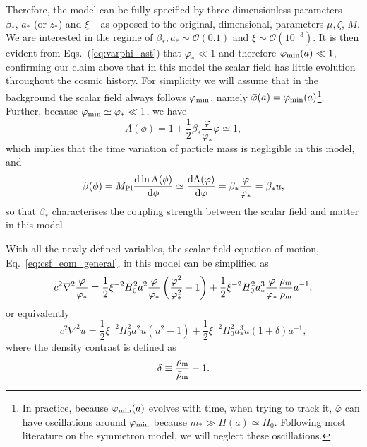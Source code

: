 Therefore, the model can be fully specified by three dimensionless parameters -- $\beta_\ast$, $a_\ast$ (or $z_\ast$) and $\xi$ -- as opposed to the original, dimensional, parameters $\mu, \zeta$, $M$. We are interested in the regime of $\beta_\ast, a_\ast\sim\mathcal{O}(0.1)$ and $\xi\sim\mathcal{O}\left(10^{-3}\right)$. It is then evident from Eqs.~(\ref{eq:varphi_ast}) that $\varphi_\ast\ll1$ and therefore $\varphi_{\rm min}(a)\ll1$, confirming our claim above that in this model the scalar field has little evolution throughout the cosmic history. For simplicity we will assume that in the background the scalar field always follows $\varphi_{\rm min}$, namely $\bar{\varphi}(a)=\varphi_{\rm min}(a)$\footnote{In practice, because $\varphi_{\rm min}(a)$ evolves with time, when trying to track it, $\bar{\varphi}$ can have oscillations around $\varphi_{\rm min}$ because $m_\ast\gg H(a)\simeq H_0$. Following most literature on the symmetron model, we will neglect these oscillations.}. Further, because $\varphi_{\rm min}\simeq\varphi_\ast\ll1$, we have
\begin{equation}
    A(\phi) = 1 + \frac{1}{2}\beta_\ast\frac{\varphi}{\varphi_\ast}\varphi \simeq 1,
\end{equation}
which implies that the time variation of particle mass is negligible in this model, and 
\begin{equation}\label{eq:sym_coupling_strength}
    \beta(\phi) = M_{\rm Pl}\frac{{\rm d\ln A(\phi)}}{{\rm d}\phi} \simeq \frac{{\rm dA(\varphi)}}{{\rm d\varphi}} = \beta_\ast\frac{\varphi}{\varphi_\ast} = \beta_\ast u,
\end{equation}
so that $\beta_\ast$ characterises the coupling strength between the scalar field and matter in this model. 

With all the newly-defined variables, the scalar field equation of motion, Eq.~\eqref{eq:csf_eom_general}, in this model can be simplified as 
\begin{equation}
    c^2\nabla^2\frac{\varphi}{\varphi_\ast} = \frac{1}{2}\xi^{-2}H_0^2a^2\frac{\varphi}{\varphi_\ast}\left(\frac{\varphi^2}{\varphi_\ast^2}-1\right) + \frac{1}{2}\xi^{-2}H_0^2a_\ast^3\frac{\varphi}{\varphi_\ast}\frac{{\rho}_m}{\bar{\rho}_{\rm m}}a^{-1},
\end{equation}
or equivalently
\begin{equation}\label{eq:sym_eom}
    c^2\nabla^2u = \frac{1}{2}\xi^{-2}H_0^2a^2u\left(u^2-1\right) + \frac{1}{2}\xi^{-2}H_0^2a_\ast^3u(1+\delta)a^{-1},
\end{equation}
where the density contrast is defined as
\begin{equation}
    \delta \equiv \frac{\rho_{\rm m}}{\bar{\rho}_{\rm m}}-1.
\end{equation}

